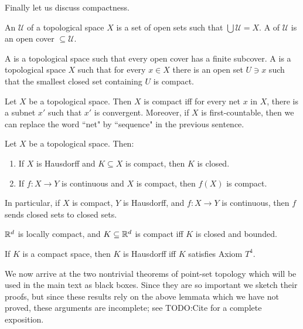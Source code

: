 Finally let us discuss compactness.

\begin{definition}
An  $\mathcal U$ of a topological space $X$ is a set of open sets such that $\bigcup \mathcal U = X$.
A  of $\mathcal U$ is an open cover $\subseteq \mathcal U$.
\end{definition}

\begin{definition}
A  is a topological space such that every open cover has a finite subcover.
A  is a topological space $X$ such that for every $x \in X$ there is an open set $U \ni x$ such that the smallest closed set containing $U$ is compact.
\end{definition}

\begin{lemma}
Let $X$ be a topological space. Then $X$ is compact iff for every net $x$ in $X$, there is a subnet $x'$ such that $x'$ is convergent.
Moreover, if $X$ is first-countable, then we can replace the word ``net" by ``sequence" in the previous sentence.
\end{lemma}

\begin{lemma}
Let $X$ be a topological space. Then:
\begin{enumerate}
\item If $X$ is Hausdorff and $K \subseteq X$ is compact, then $K$ is closed.
\item If $f: X \to Y$ is continuous and $X$ is compact, then $f(X)$ is compact.
\end{enumerate}
In particular, if $X$ is compact, $Y$ is Hausdorff, and $f: X \to Y$ is continuous, then $f$ sends closed sets to closed sets.
\end{lemma}

\begin{theorem}
$\mathbb{R}^d$ is locally compact, and $K \subseteq \mathbb{R}^d$ is compact iff $K$ is closed and bounded.
\end{theorem}

\begin{lemma}
If $K$ is a compact space, then $K$ is Hausdorff iff $K$ satisfies Axiom $T^4$.
\end{lemma}

We now arrive at the two nontrivial theorems of point-set topology which will be used in the main text as black boxes.
Since they are so important we sketch their proofs, but since these results rely on the above lemmata which we have not proved, these arguments are incomplete; see TODO:Cite for a complete exposition.


